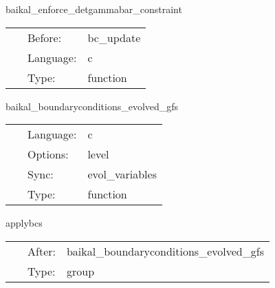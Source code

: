 \vspace{5mm}


\hspace{5mm} baikal\_enforce\_detgammabar\_constraint 

\hspace{5mm}{\it enforce detgammabar = detgammahat (= 1 in cartesian) } 


\hspace{5mm}

 \begin{tabular*}{160mm}{cll} 
~ & Before:  & bc\_update \\ 
~ & Language:  & c \\ 
~ & Type:  & function \\ 
\end{tabular*} 


\vspace{5mm}


\hspace{5mm} baikal\_boundaryconditions\_evolved\_gfs 

\hspace{5mm}{\it apply boundary conditions and perform amr+interprocessor synchronization } 


\hspace{5mm}

 \begin{tabular*}{160mm}{cll} 
~ & Language:  & c \\ 
~ & Options:  & level \\ 
~ & Sync:  & evol\_variables \\ 
~ & Type:  & function \\ 
\end{tabular*} 


\vspace{5mm}


\hspace{5mm} applybcs 

\hspace{5mm}{\it group for applying boundary conditions } 


\hspace{5mm}

 \begin{tabular*}{160mm}{cll} 
~ & After:  & baikal\_boundaryconditions\_evolved\_gfs \\ 
~ & Type:  & group \\ 
\end{tabular*} 


